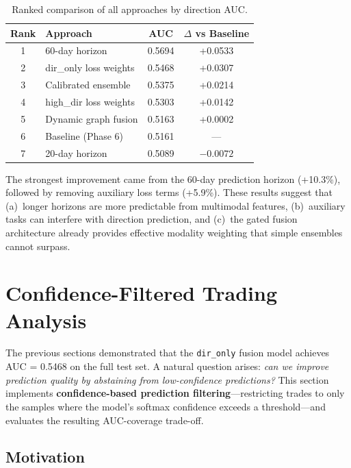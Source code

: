 \documentclass[12pt,a4paper]{article}
\begin{document}
\begin{table}[H]
\centering
\caption{Ranked comparison of all approaches by direction AUC.}
\begin{tabular}{clcc}
\toprule
\textbf{Rank} & \textbf{Approach} & \textbf{AUC} & \textbf{$\Delta$ vs Baseline} \\
\midrule
1 & 60-day horizon            & 0.5694 & +0.0533 \\
2 & dir\_only loss weights    & 0.5468 & +0.0307 \\
3 & Calibrated ensemble       & 0.5375 & +0.0214 \\
4 & high\_dir loss weights    & 0.5303 & +0.0142 \\
5 & Dynamic graph fusion      & 0.5163 & +0.0002 \\
6 & Baseline (Phase 6)        & 0.5161 & --- \\
7 & 20-day horizon            & 0.5089 & $-0.0072$ \\
\bottomrule
\end{tabular}
\end{table}

\noindent The strongest improvement came from the 60-day prediction horizon (+10.3\%), followed by removing auxiliary loss terms (+5.9\%). These results suggest that (a)~longer horizons are more predictable from multimodal features, (b)~auxiliary tasks can interfere with direction prediction, and (c)~the gated fusion architecture already provides effective modality weighting that simple ensembles cannot surpass.

\section{Confidence-Filtered Trading Analysis}
\label{sec:confidence}

The previous sections demonstrated that the \texttt{dir\_only} fusion model achieves AUC = 0.5468 on the full test set. A natural question arises: \emph{can we improve prediction quality by abstaining from low-confidence predictions?} This section implements \textbf{confidence-based prediction filtering}---restricting trades to only the samples where the model's softmax confidence exceeds a threshold---and evaluates the resulting AUC-coverage trade-off.

\subsection{Motivation}
\end{document}
